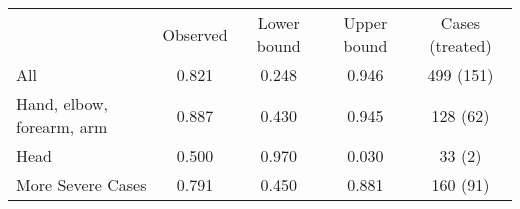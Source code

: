 \begin{tabular}{lcccc} \hline
                          &  Observed & Lower bound & Upper bound & Cases (treated) \\
All                       & 0.821     & 0.248       & 0.946       & 499 (151)       \\
Hand, elbow, forearm, arm & 0.887     & 0.430       & 0.945       & 128 (62)        \\
Head                      & 0.500     & 0.970       & 0.030       & 33 (2)          \\
More Severe Cases         & 0.791     & 0.450       & 0.881       & 160 (91)        \\ \hline
\end{tabular}